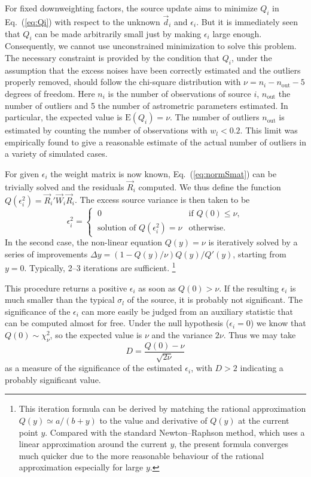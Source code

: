 \documentclass[structabstract]{aa}
\begin{document}
For fixed downweighting
factors, the source update aims to minimize $Q_i$ in Eq.~(\ref{eq:Qi})
with respect to the unknown $\vec{d}_i$ and $\epsilon_i$. But it is 
immediately seen that $Q_i$ can be made arbitrarily small just by making 
$\epsilon_i$ large enough. Consequently, we cannot use unconstrained
minimization to solve this problem. The necessary constraint is provided 
by the condition that $Q_i$, under the assumption that the excess noises 
have been correctly estimated and the outliers properly removed, should 
follow the chi-square distribution with $\nu = n_i - n_\text{out} - 5$ 
degrees of freedom. Here $n_i$ is the number of observations of source
$i$, $n_\text{out}$ the number of outliers and 5
the number of astrometric parameters estimated. In particular, the expected 
value is $\mbox{E}(Q_i)=\nu$. The number of outliers $n_\text{out}$ is estimated
by counting the number of observations with $w_l < 0.2$. This limit was
empirically found to give a reasonable estimate of the actual number of
outliers in a variety of simulated cases. 

For given $\epsilon_i$ the weight matrix is now known, Eq.~(\ref{eq:normSmat}) 
can be trivially solved and the residuals $\vec{R}_i$ computed. We thus define 
the function $Q(\epsilon_i^2)=\vec{R}_i' \vec{W}_i \vec{R}_i$. The excess source 
variance is then taken to be
\begin{equation} \label{eq:epsi}
\epsilon_i^2 = \begin{cases} ~0 & \text{if $Q(0)\le\nu$}, \\
~\text{solution of $Q(\epsilon_i^2)=\nu$} & \text{otherwise}. \end{cases}
\end{equation}
In the second case, the non-linear equation $Q(y)=\nu$ is iteratively solved 
by a series of improvements $\Delta y=(1-Q(y)/\nu)Q(y)/Q'(y)$, starting from 
$y=0$. Typically, 2--3 iterations are sufficient.%
\footnote{This iteration formula can be derived by matching the rational 
approximation $Q(y)\simeq a/(b+y)$ to the value and derivative of $Q(y)$
at the current point $y$. Compared with the standard Newton--Raphson 
method, which uses a linear approximation around the current $y$, the
present formula converges much quicker due to the more reasonable 
behaviour of the rational approximation especially for large $y$.}

This procedure returns a positive $\epsilon_i$ as soon as $Q(0)>\nu$.
If the resulting $\epsilon_i$ is much smaller than the typical $\sigma_l$
of the source, it is probably not significant. The significance of the 
$\epsilon_i$ can more easily be judged from an auxiliary statistic that
can be computed almost for free. Under the null hypothesis ($\epsilon_i=0$)
we know that $Q(0) \sim \chi^2_\nu$, so the expected value is $\nu$
and the variance $2\nu$. Thus we may take
\begin{equation} \label{eq:D}
D = \frac{Q(0)-\nu}{\sqrt{2\nu}}
\end{equation}
as a measure of the significance of the estimated $\epsilon_i$, with 
$D > 2$ indicating a probably significant value.
\end{document}
